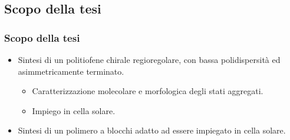 \documentclass{beamer}
\begin{document}
\subsection{Scopo della tesi}
\begin{frame}%
\frametitle{Scopo della tesi}
\begin{itemize}
\item Sintesi di un politiofene chirale regioregolare, con bassa polidispersità ed asimmetricamente terminato.
\begin{itemize}
\item Caratterizzazione molecolare e morfologica degli stati aggregati.
\item Impiego in cella solare.
\end{itemize}
\item Sintesi di un polimero a blocchi adatto ad essere impiegato in cella solare.
\end{itemize}
\end{frame}
\end{document}
